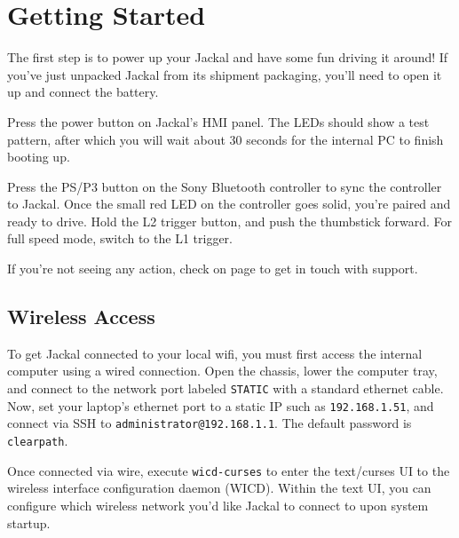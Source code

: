 \documentclass[]{clearpath-latex/clearpath-manual}
\begin{document}
\section{Getting Started}

The first step is to power up your Jackal and have some fun driving it around! If you've
just unpacked Jackal from its shipment packaging, you'll need to open it up and connect the
battery.

Press the power button  on
Jackal's HMI panel. The LEDs should show a test pattern, after which you will wait about 30
seconds for the internal PC to finish booting up.

  
Press the PS/P3 button on the Sony Bluetooth controller to sync the controller to Jackal. Once
the small red LED on the controller goes solid, you're paired and ready to drive. Hold the L2 trigger
button, and push the thumbstick forward. For full speed mode, switch to the L1 trigger.

If you're not seeing any action, check  on page \pageref{trouble} to
get in touch with support.

\subsection{Wireless Access}

To get Jackal connected to your local wifi, you must first access the internal computer
using a wired connection. Open the chassis, lower the computer tray, and connect to the network port
labeled \lstinline{STATIC} with a standard ethernet cable. Now, set your laptop's ethernet port
to a static IP such as \lstinline{192.168.1.51}, and connect via SSH to
\lstinline{administrator@192.168.1.1}. The default password is \lstinline{clearpath}.

Once connected via wire, execute \lstinline{wicd-curses} to enter the text/curses UI to the
wireless interface configuration daemon (WICD). Within the text UI, you can configure
which wireless network you'd like Jackal to connect to upon system startup.
\end{document}
